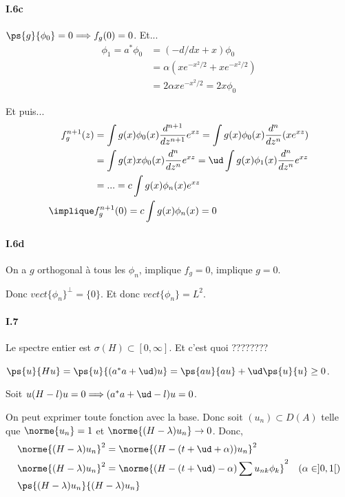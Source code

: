 \paragraph{I.6c}

$\ps{g}{\phi_0} = 0 \Longrightarrow f_g(0) = 0$. Et...
\begin{align}
    \phi_1 = a^* \phi_0 &= (-d/dx + x) \phi_0 \\
    &= \alpha ( x e^{-x^2 / 2} + x e^{-x^2 / 2} ) \\
    &= 2\alpha x e^{-x^2 / 2} = 2x \phi_0
\end{align}

Et puis...
%
\begin{align}
    f_g^{n+1}(z) &= \int g(x) \phi_0(x) \frac{d^{n+1}}{dz^{n+1}} e^{xz}
    = \int g(x) \phi_0(x) \frac{d^{n}}{dz^{n}} (x e^{xz}) \\
    &= \int g(x)    x \phi_0(x)    \frac{d^{n}}{dz^{n}} e^{xz}
    = \ud \int g(x) \phi_1(x) \frac{d^{n}}{dz^{n}} e^{xz} \\
    &= ... = c \int g(x) \phi_n(x) e^{xz} \\
    \implique & f_g^{n+1}(0) = c \int g(x) \phi_n(x) = 0
\end{align}

\paragraph{I.6d}

On a $g$ orthogonal à tous les $\phi_n$, implique $f_g = 0$, implique
$g = 0$.

Donc $vect \{ \phi_n \}^\perp = \{0\}$. Et donc $vect \{ \phi_n \} = L^2$.

\paragraph{I.7}

Le spectre entier est $\sigma(H) \subset [0, \infty]$.
Et c'est quoi ????????

$\ps{u}{Hu} = \ps{u}{(a^* a + \ud)u} = \ps{au}{au}
+ \ud \ps{u}{u} \geq 0$.

Soit $u (H - l)u = 0 \Longrightarrow (a^* a + \ud - l)u = 0$.

On peut exprimer toute fonction avec la base. Donc soit $(u_n) \subset D(A)$
telle que $\norme{u_n} = 1$ et $\norme{(H - \lambda) u_n} \rightarrow 0$.
Donc,
\begin{align}
    & \norme{(H - \lambda) u_n}^2 = \norme{(H - (t + \ud + \alpha)) u_n}^2 \\
    & \norme{(H - \lambda) u_n}^2
    = \norme{(H - (t + \ud) - \alpha) \sum u_{nk} \phi_k}^2 \quad (\alpha \in ]0,1[)\\
%
& \ps{(H - \lambda) u_n}{(H - \lambda) u_n}
\end{align}



